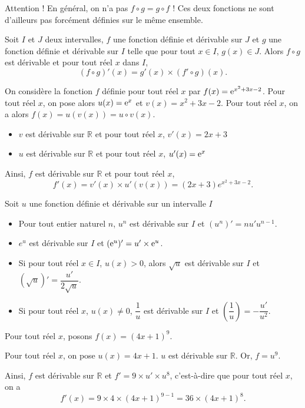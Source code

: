 \documentclass[11pt,fleqn, openany]{book} %
\begin{document}
Attention ! En général, on n'a pas $f \circ g = g \circ f$ ! Ces deux fonctions ne sont d'ailleurs pas forcément définies sur le même ensemble.

\begin{proposition}Soit $I$ et $J$ deux intervalles, $f$ une fonction définie et dérivable sur $J$ et $g$ une fonction définie et dérivable sur $I$ telle que pour tout $x \in I$, $g(x) \in J$. Alors $f \circ g$ est dérivable et pour tout réel $x$ dans $I$,
\[ (f \circ g)' (x)= g'(x) \times (f' \circ g)(x).\]
\vspace{-0.5cm}\end{proposition}



\begin{example}On considère la fonction $f$ définie pour tout réel $x$ par $f(x)=\mathrm{e}^{x^2+3x-2}$. 
Pour tout réel $x$, on pose alors $u(x)=\mathrm{e}^x$ et $v(x)=x^2+3x-2$. Pour tout réel $x$, on a alors  $f(x)= u(v(x)) = u \circ v (x)$.

\begin{itemize}
\item $v$ est dérivable sur $\mathbb{R}$ et pour tout réel $x$, $v'(x)=2x+3$
\item $u$ est dérivable sur $\mathbb{R}$ et pour tout réel $x$, $u'(x)=\mathrm{e}^x$
\end{itemize}
Ainsi, $f$ est dérivable sur $\mathbb{R}$ et pour tout réel $x$, 
\[ f'(x)= v'(x) \times u'(v(x)) = (2x+3)e^{x^2+3x-2}.\]\end{example}
\begin{proposition} Soit $u$ une fonction définie et dérivable sur un intervalle $I$
\begin{itemize}
\item Pour tout entier naturel $n$, $u^n$ est dérivable sur $I$ et $(u^n)'=nu'u^{n-1}$.
\item $e^u$ est dérivable sur $I$ et $(\mathrm{e}^u)'=u' \times \mathrm{e}^u$.
\item Si pour tout réel $x\in I$, $u(x)>0$, alors $\sqrt{u}$ est dérivable sur $I$ et $(\sqrt{u})' = \dfrac{u'}{2\sqrt{u}}$.
\item Si pour tout réel $x$, $u(x) \neq 0$, $\dfrac{1}{u}$ est dérivable sur $I$ et $\left(\dfrac{1}{u}\right)=-\dfrac{u'}{u^2}$.
\end{itemize}\end{proposition}

\begin{example}Pour tout réel $x$, posons $f(x)=(4x+1)^9$.

Pour tout réel $x$, on pose $u(x)=4x+1$. $u$ est dérivable sur $\mathbb{R}$. Or, $f=u^9$.

 Ainsi, $f$ est dérivable sur $\mathbb{R}$ et $f'=9\times u' \times u^8$, c'est-à-dire que pour tout réel $x$, on a
\[ f'(x)= 9 \times 4 \times (4x+1)^{9-1}=36 \times (4x+1)^8.\]\end{example}
\end{document}
